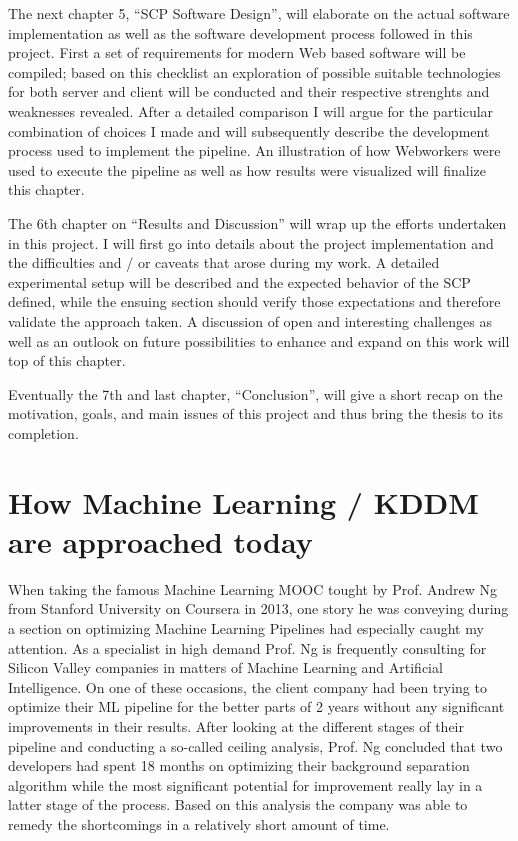 \par

The next chapter 5, ``SCP Software Design'', will elaborate on the actual software implementation as well as the software development process followed in this project. First a set of requirements for modern Web based software will be compiled; based on this checklist an exploration of possible suitable technologies for both server and client will be conducted and their respective strenghts and weaknesses revealed. After a detailed comparison I will argue for the particular combination of choices I made and will subsequently describe the development process used to implement the pipeline. An illustration of how Webworkers were used to execute the pipeline as well as how results were visualized will finalize this chapter.

\par

The 6th chapter on ``Results and Discussion'' will wrap up the efforts undertaken in this project. I will first go into details about the project implementation and the difficulties and / or caveats that arose during my work. A detailed experimental setup will be described and the expected behavior of the SCP defined, while the ensuing section should verify those expectations and therefore validate the approach taken. A discussion of open and interesting challenges as well as  an outlook on future possibilities to enhance and expand on this work will top of this chapter.

\par 

Eventually the 7th and last chapter, ``Conclusion'', will give a short recap on the motivation, goals, and main issues of this project and thus bring the thesis to its completion.



\section{How Machine Learning / KDDM are approached today}
\label{sect:ml_kddm_today}

When taking the famous Machine Learning MOOC tought by Prof. Andrew Ng from Stanford University on Coursera in 2013, one story he was conveying during a section on optimizing Machine Learning Pipelines had especially caught my attention. As a specialist in high demand Prof. Ng is frequently consulting for Silicon Valley companies in matters of Machine Learning and Artificial Intelligence. On one of these occasions, the client company had been trying to optimize their ML pipeline for the better parts of 2 years without any significant improvements in their results. After looking at the different stages of their pipeline and conducting a so-called ceiling analysis, Prof. Ng concluded that two developers had spent 18 months on optimizing their background separation algorithm while the most significant potential for improvement really lay in a latter stage of the process. Based on this analysis the company was able to remedy the shortcomings in a relatively short amount of time.

